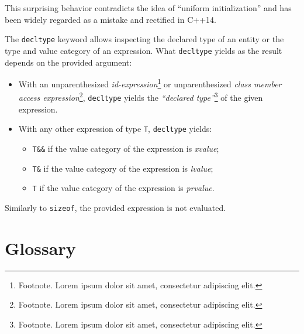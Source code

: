 \documentclass[twoside,10pt,letterpaper,usenames]{newstyle-PearsonGeneric-7-38}
\begin{document}
This surprising behavior contradicts the idea of ``uniform
initialization'' and has been widely regarded as a mistake and rectified
in C++14.

The \texttt{decltype} keyword allows inspecting the declared type of an
entity or the type and value category of an expression. What
\texttt{decltype} yields as the result depends on the provided argument:

\begin{itemize}
\item
  With an unparenthesized \emph{id-expression}{\cprotect\footnote{Footnote.
    Lorem ipsum dolor sit amet, consectetur adipiscing elit.}} or
  unparenthesized \emph{class member access
  expression}{\cprotect\footnote{Footnote. Lorem ipsum dolor sit amet,
    consectetur adipiscing elit.}}, \texttt{decltype} yields the
  \emph{``declared type''}{\cprotect\footnote{Footnote. Lorem ipsum
    dolor sit amet, consectetur adipiscing elit.}} of the given
  expression.
\item
  With any other expression of type \texttt{T}, \texttt{decltype}
  yields:

  \begin{itemize}
  \item
    \texttt{T\&\&} if the value category of the expression is
    \emph{xvalue};
  \item
    \texttt{T\&} if the value category of the expression is
    \emph{lvalue};
  \item
    \texttt{T} if the value category of the expression is
    \emph{prvalue}.
  \end{itemize}
\end{itemize}

Similarly to \texttt{sizeof}, the provided expression is not evaluated.

\newpage

\cleardoublepage

\chapter*{Glossary}\label{Glossary}

\end{document}
